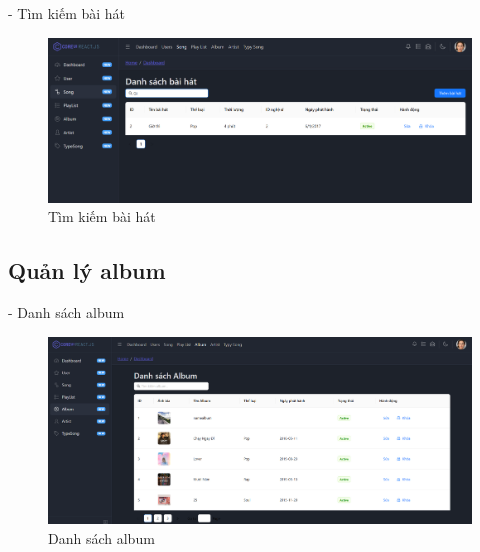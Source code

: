 - Tìm kiếm bài hát
\begin{figure}[H]
    \centering
    \includegraphics[width=1\textwidth]{imgs/chap5/ql_bai_hat_8.png}
    \caption{Tìm kiếm bài hát}
\end{figure}

\subsection{Quản lý album}
- Danh sách album
\begin{figure}[H]
    \centering
    \includegraphics[width=1\textwidth]{imgs/chap5/ql_album_1.png}
    \caption{Danh sách album}
\end{figure}

